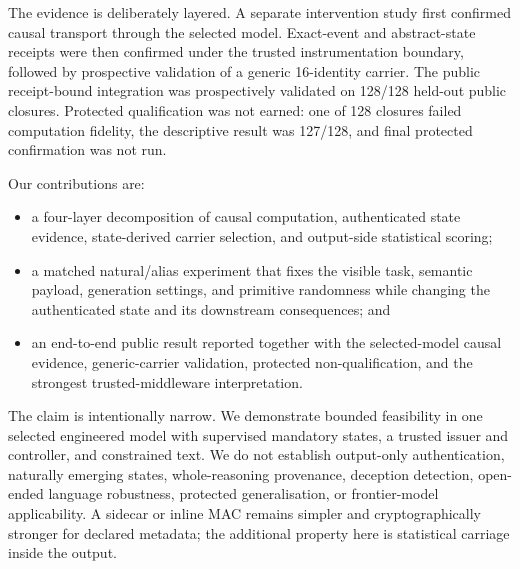 The evidence is deliberately layered. A separate intervention study first
confirmed causal transport through the selected model. Exact-event and
abstract-state receipts were then confirmed under the trusted instrumentation
boundary, followed by prospective validation of a generic 16-identity carrier.
The public receipt-bound integration was prospectively validated on 128/128
held-out public closures. Protected qualification was not earned: one of 128
closures failed computation fidelity, the descriptive result was 127/128, and
final protected confirmation was not run.

Our contributions are:
\begin{itemize}
  \item a four-layer decomposition of causal computation, authenticated state
  evidence, state-derived carrier selection, and output-side statistical
  scoring;
  \item a matched natural/alias experiment that fixes the visible task,
  semantic payload, generation settings, and primitive randomness while
  changing the authenticated state and its downstream consequences; and
  \item an end-to-end public result reported together with the selected-model
  causal evidence, generic-carrier validation, protected non-qualification,
  and the strongest trusted-middleware interpretation.
\end{itemize}

The claim is intentionally narrow. We demonstrate bounded feasibility in one
selected engineered model with supervised mandatory states, a trusted
\hmac{} issuer and controller, and constrained text. We do not establish
output-only authentication, naturally emerging states, whole-reasoning
provenance, deception detection, open-ended language robustness, protected
generalisation, or frontier-model applicability. A sidecar or inline MAC
remains simpler and cryptographically stronger for declared metadata; the
additional property here is statistical carriage inside the output.
